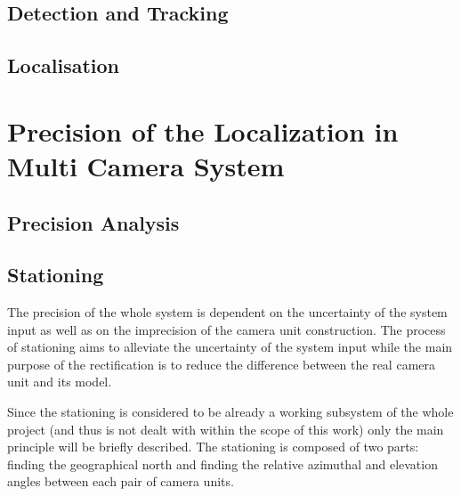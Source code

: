\section{Detection and Tracking}


\section{Localisation}

\chapter{Precision of the Localization in Multi Camera System}

\section{Precision Analysis}

\vata[20]

\section{Stationing}

The precision of the whole system is dependent on the uncertainty of the system input as well as on the imprecision of the camera unit construction. The process of stationing aims to alleviate the uncertainty of the system input while the main purpose of the rectification is to reduce the difference between the real camera unit and its model.

Since the stationing is considered to be already a working subsystem of the whole project (and thus is not dealt with within the scope of this work) only the main principle will be briefly described. The stationing is composed of two parts: finding the geographical north and finding the relative azimuthal and elevation angles between each pair of camera units.

